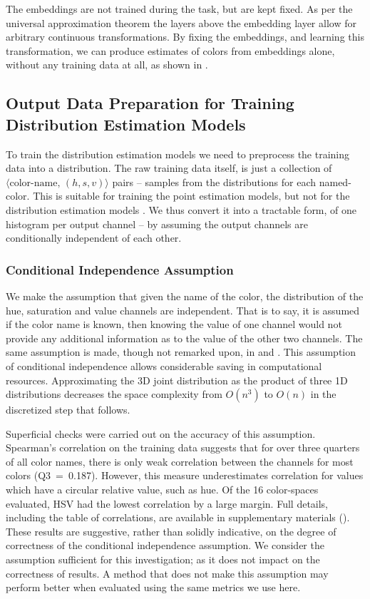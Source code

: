 \documentclass[]{clv3}
\newcommand{\parencite}{\citep}
\newcommand{\textcite}{\citet}
\newcommand{\datapairs}{$\langle\text{color-name},\,(h,s,v)\rangle$}
\begin{document}
The embeddings are not trained during the task, but are kept fixed.
As per the universal approximation theorem \parencite{leshno1993uat, SONODA2017uat} the layers above the embedding layer allow for arbitrary continuous transformations.
By fixing the embeddings, and learning this transformation,
we can produce estimates of colors from embeddings alone, without any training data at all, as shown in .

\subsection{Output Data Preparation for Training Distribution Estimation Models}\label{sec:output-data-preparation}
To train the distribution estimation models we need to preprocess the training data into a distribution.
The raw training data itself, is just a collection of 
 \datapairs{} pairs -- samples from the distributions for each named-color.
This is suitable for training the point estimation models, but not for the distribution estimation models .
We thus convert it into a tractable form, of one histogram per output channel -- by assuming the output channels are conditionally independent of each other.


\subsubsection{Conditional Independence Assumption} \label{sec:conditional-independence-assumption}
We make the assumption that given the name of the color, the distribution of the hue, saturation and value channels are independent.
That is to say, it is assumed if the color name is known, then  knowing the value of one channel would not provide any additional information as to the value of the other two channels.
The same assumption is made, though not remarked upon, in \textcite{meomcmahanstone:color} and \textcite{mcmahan2015bayesian}.
This assumption of conditional independence allows considerable saving in computational resources.
Approximating the 3D joint distribution as the product of three 1D distributions decreases the space complexity from $O(n^3)$ to $O(n)$ in the discretized step that follows.

Superficial checks were carried out on the accuracy of this assumption.
Spearman's correlation on the training data suggests that for over three quarters of all color names, there is only weak correlation between the channels for most colors (\mbox{Q3 = 0.187}).
However, this measure underestimates correlation for values which have a circular relative value, such as hue.
Of the 16 color-spaces evaluated, HSV had the lowest correlation by a large margin.
Full details, including the table of correlations, are available in supplementary materials ().
These results are suggestive, rather than solidly indicative, on the degree of correctness of the conditional independence assumption.
We consider the assumption sufficient for this investigation; as it does not impact on the correctness of results.
A method that does not make this assumption may perform better when evaluated using the same metrics we use here.
\end{document}
